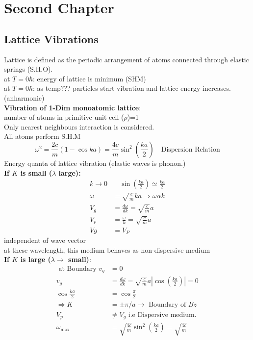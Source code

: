 \chapter{Second Chapter}
\section{Lattice Vibrations}
Lattice is defined as the periodic arrangement of atoms connected through elastic springs (S.H.O).\\
at $T=0\hbar$: energy of lattice is minimum (SHM)\\
at $T=0\hbar$: as temp??? particles start vibration and lattice energy increases. (anharmonic)\\
\textbf{Vibration of 1-Dim monoatomic lattice}:\\
number of atoms in primitive unit cell ($\rho$)=1\\
Only nearest neighbours interaction is considered.\\
All atoms perform S.H.M\\
$$\omega^{2}=\frac{2 c}{m}(1-\cos k a)=\frac{4 c}{m} \sin ^{2}\left(\frac{k a}{2}\right)\quad \text{Dispersion Relation}$$
Energy quanta of lattice vibration (elastic waves is phonon.)\\
\textbf{If $K$ is small ($\lambda$ large):}\\
\begin{align*}
k \rightarrow 0 &\quad \sin \left(\frac{k a}{2}\right) \simeq \frac{k a}{2}\\
\omega&=\sqrt{\frac{c}{m}} k a \Rightarrow \omega \alpha k\\
V_{g}&=\frac{d \omega}{d k}=\sqrt{\frac{c}{m}} a\\
V_{p}&=\frac{\omega}{k}=\sqrt{\frac{c}{m}} a\\
V g&=V_{P}
\end{align*}
independent of wave vector \\
at these wavelength, this medium behaves as non-dispersive medium\\
\textbf{If $K$ is large ($\lambda\rightarrow$ small)}:
\begin{align*}
\text { at Boundary } v_{g}&=0\\
v_{g}&=\frac{d \omega}{d k}=\sqrt{\frac{c}{m}} a\left|\cos \left(\frac{k a}{2}\right)\right|=0\\
\cos \frac{k a}{2}&=\cos \frac{\pi}{2}\\
\Rightarrow K&=\pm \pi / a \rightarrow \text { Boundary of } B z\\
V_{p} &\neq V_{g} \text { i.e Dispersive medium. }\\
\omega_{\max }&=\sqrt{\frac{4 c}{m}} \sin ^{2}\left(\frac{k a}{2}\right)=\sqrt{\frac{4 c}{m}}
\end{align*}
